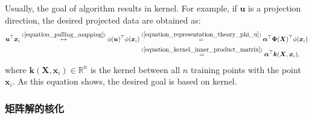 \documentclass[lang=cn,10pt]{gorgeousnbook}
\numberwithin{equation}{section}%
\numberwithin{figure}{section}%
\begin{document}
Usually, the goal of algorithm results in kernel. For example, if $\boldsymbol{u}$ is a projection direction, the desired projected data are obtained as:
\begin{align}
\boldsymbol{u}^\top \boldsymbol{x}_i \overset{(\ref{equation_pulling_mapping})}{\mapsto} \phi(\boldsymbol{u})^\top \phi(\boldsymbol{x}_i) &\overset{(\ref{equation_representation_theory_phi_u})}{=} \boldsymbol{\alpha}^\top \boldsymbol{\Phi}(\boldsymbol{X})^\top \phi(\boldsymbol{x}_i) \nonumber \\
&\overset{(\ref{equation_kernel_inner_product_matrix})}{=} \boldsymbol{\alpha}^\top \boldsymbol{k}(\boldsymbol{X}, \boldsymbol{x}_i),
\end{align}
where $\boldsymbol{k}(\boldsymbol{X}, \boldsymbol{x}_i) \in \mathbb{R}^n$ is the kernel between all $n$ training points with the point $\boldsymbol{x}_i$.
As this equation shows, the desired goal is based on kernel. 

\subsubsection{矩阵解的核化}
\end{document}
